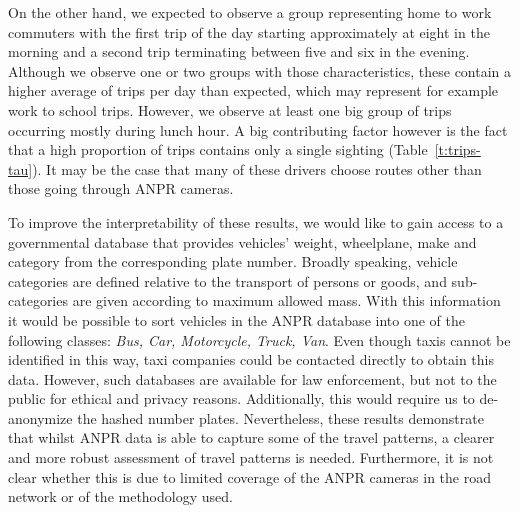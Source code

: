 On the other hand, we expected to observe a group representing home to work commuters with the first trip of the day starting approximately at eight in the morning and a second trip terminating between five and six in the evening. Although we observe one or two groups with those characteristics, these contain a higher average of trips per day than expected, which may represent for example work to school trips. However, we observe at least one big group of trips occurring mostly during lunch hour. A big contributing factor however is the fact that a high proportion of trips contains only a single sighting (Table~\ref{t:trips-tau}). It may be the case that many of these drivers choose routes other than those going through ANPR cameras.

To improve the interpretability of these results, we would like to gain access to a governmental database that provides vehicles' weight, wheelplane, make and category from the corresponding plate number. Broadly speaking, vehicle categories are defined relative to the transport of persons or goods, and sub-categories are given according to maximum allowed mass. With this information it would be possible to sort vehicles in the ANPR database into one of the following classes: \textit{Bus, Car, Motorcycle, Truck, Van}. Even though taxis cannot be identified in this way, taxi companies could be contacted directly to obtain this data. However, such databases are available for law enforcement, but not to the public for ethical and privacy reasons. Additionally, this would require us to de-anonymize the hashed number plates. Nevertheless, these results demonstrate that whilst ANPR data is able to capture some of the travel patterns, a clearer and more robust assessment of travel patterns is needed. Furthermore, it is not clear whether this is due to limited coverage of the ANPR cameras in the road network or of the methodology used.



